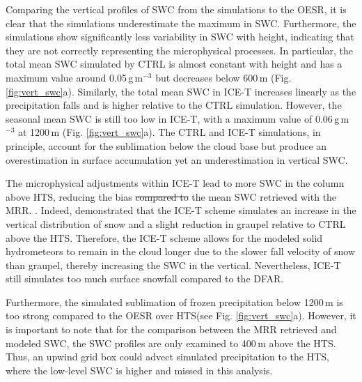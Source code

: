 \documentclass{ametsocV5}
\providecommand{\DIFadd}[1]{{\protect\color{blue}\uwave{#1}}} %
\providecommand{\DIFdel}[1]{{\protect\color{red}\sout{#1}}}                      %
\providecommand{\DIFaddbegin}{} %
\providecommand{\DIFaddend}{} %
\providecommand{\DIFdelbegin}{} %
\providecommand{\DIFdelend}{} %
\newcommand{\DIFscaledelfig}{0.5}
\newlength{\DIFdelgraphicswidth} %
\newlength{\DIFdelgraphicsheight} %
\newcommand{\DIFaddincludegraphics}[2][]{{\color{blue}\fbox{\DIFOincludegraphics[#1]{#2}}}} %
\newcommand{\DIFdelincludegraphics}[2][]{%
\sbox{\DIFdelgraphicsbox}{\DIFOincludegraphics[#1]{#2}}%
\settoboxwidth{\DIFdelgraphicswidth}{\DIFdelgraphicsbox} %
\settoboxtotalheight{\DIFdelgraphicsheight}{\DIFdelgraphicsbox} %
\scalebox{\DIFscaledelfig}{%
\parbox[b]{\DIFdelgraphicswidth}{\usebox{\DIFdelgraphicsbox}\\[-\baselineskip] \rule{\DIFdelgraphicswidth}{0em}}\llap{\resizebox{\DIFdelgraphicswidth}{\DIFdelgraphicsheight}{%
\setlength{\unitlength}{\DIFdelgraphicswidth}%
\begin{picture}(1,1)%
\thicklines\linethickness{2pt} %
{\color[rgb]{1,0,0}\put(0,0){\framebox(1,1){}}}%
{\color[rgb]{1,0,0}\put(0,0){\line( 1,1){1}}}%
{\color[rgb]{1,0,0}\put(0,1){\line(1,-1){1}}}%
\end{picture}%
}\hspace*{3pt}}} %
} %
\DeclareRobustCommand{\DIFaddbegin}{\DIFOaddbegin \let\includegraphics\DIFaddincludegraphics} %
\DeclareRobustCommand{\DIFaddend}{\DIFOaddend \let\includegraphics\DIFOincludegraphics} %
\DeclareRobustCommand{\DIFdelbegin}{\DIFOdelbegin \let\includegraphics\DIFdelincludegraphics} %
\DeclareRobustCommand{\DIFdelend}{\DIFOaddend \let\includegraphics\DIFOincludegraphics} %
\begin{document}
		Comparing the vertical profiles of SWC from the simulations to the OESR, it is clear that the simulations underestimate the maximum in SWC. Furthermore, the simulations show significantly less variability in SWC with height, indicating that they are not correctly representing the microphysical processes. In particular, the total mean SWC simulated by CTRL is almost constant with height and has a maximum value around 0.05\,g\,m$^{-3}$ but decreases below 600\,m (Fig. \ref{fig:vert_swc}a). Similarly, the total mean SWC in ICE-T increases linearly as the precipitation falls and is higher relative to the CTRL simulation. However, the seasonal mean SWC is still too low in ICE-T, with a maximum value of 0.06\,g\,m$^{-3}$ at 1200\,m (Fig. \ref{fig:vert_swc}a). The CTRL and ICE-T simulations, in principle, account for the sublimation below the cloud base but produce an overestimation in surface accumulation yet an underestimation in vertical SWC. 

		The microphysical adjustments within ICE-T lead to more SWC in the column above HTS, reducing the bias \DIFdelbegin \DIFdel{compared to }\DIFdelend \DIFaddbegin \DIFadd{than }\DIFaddend the mean SWC retrieved with the MRR. \citep{engdahl_effects_2020}. Indeed, \citet{engdahl_effects_2020} demonstrated that the ICE-T scheme simulates an increase in the vertical distribution of snow and a slight reduction in graupel relative to CTRL above the HTS. Therefore, the ICE-T scheme allows for the modeled solid hydrometeors to remain in the cloud longer due to the slower fall velocity of snow than graupel, thereby increasing the SWC in the vertical. Nevertheless, ICE-T still simulates too much surface snowfall compared to the DFAR. 

		Furthermore, the simulated sublimation of frozen precipitation below 1200\,m is too strong compared to the OESR over HTS(see Fig. \ref{fig:vert_swc}a). However, it is important to note that for the comparison between the MRR retrieved and modeled SWC, the SWC profiles are only examined to 400\,m above the HTS. Thus, an upwind grid box could advect simulated precipitation to the HTS, where the low-level SWC is higher and missed in this analysis.
\end{document}
